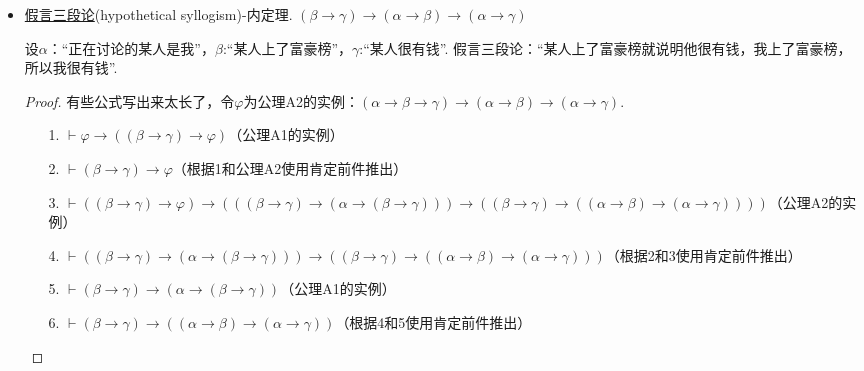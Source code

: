 \documentclass[main.tex]{subfiles}
\begin{document}
\begin{itemize}
    \item \uline{假言三段论}(hypothetical syllogism)-内定理. \((\beta \to \gamma) \to (\alpha \to \beta) \to (\alpha \to \gamma)\)
    \begin{note}
        设\(\alpha\)：“正在讨论的某人是我”，\(\beta\):“某人上了富豪榜”，\(\gamma\):“某人很有钱”. 假言三段论：“某人上了富豪榜就说明他很有钱，我上了富豪榜，所以我很有钱”.
    \end{note}
    \begin{proof}
        有些公式写出来太长了，令\(\varphi\)为公理A2的实例：\((\alpha \to \beta \to \gamma) \to (\alpha \to \beta) \to (\alpha \to \gamma)\).
        \begin{itemize}
            \item [1.] \(\vdash \varphi \to ((\beta \to \gamma) \to \varphi)\)（公理A1的实例）
            \item [2.] \(\vdash (\beta \to \gamma) \to \varphi\)（根据1和公理A2使用肯定前件推出）
            \item [3.] \(\vdash ((\beta \to \gamma) \to \varphi) \to (((\beta \to \gamma) \to (\alpha \to (\beta \to \gamma))) \to ((\beta \to \gamma) \to ((\alpha \to \beta) \to (\alpha \to \gamma))))\)（公理A2的实例）
            \item [4.] \(\vdash ((\beta \to \gamma) \to (\alpha \to (\beta \to \gamma))) \to ((\beta \to \gamma) \to ((\alpha \to \beta) \to (\alpha \to \gamma)))\)（根据2和3使用肯定前件推出）
            \item [5.] \(\vdash (\beta \to \gamma) \to (\alpha \to (\beta \to \gamma))\)（公理A1的实例）
            \item [6.] \(\vdash (\beta \to \gamma) \to ((\alpha \to \beta) \to (\alpha \to \gamma))\)（根据4和5使用肯定前件推出）
        \end{itemize}
    \end{proof}


\end{itemize}
\end{document}
